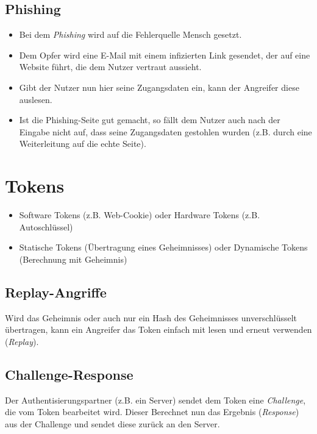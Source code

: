 \documentclass[a4paper, 11pt, accentcolor = tud3b]{tudreport}
\begin{document}
            \subsection{Phishing}
                \begin{itemize}
                	\item Bei dem \textit{Phishing} wird auf die Fehlerquelle Mensch gesetzt.
                	\item Dem Opfer wird eine E-Mail mit einem infizierten Link gesendet, der auf eine Website führt, die dem Nutzer vertraut aussieht.
                	\item Gibt der Nutzer nun hier seine Zugangsdaten ein, kann der Angreifer diese auslesen.
                	\item Ist die Phishing-Seite gut gemacht, so fällt dem Nutzer auch nach der Eingabe nicht auf, dass seine Zugangsdaten gestohlen wurden (z.B. durch eine Weiterleitung auf die echte Seite).
                \end{itemize}

        \section{Tokens}
	        \begin{itemize}
	        	\item Software Tokens (z.B. Web-Cookie) oder Hardware Tokens (z.B. Autoschlüssel)
	        	\item Statische Tokens (Übertragung eines Geheimnisses) oder Dynamische Tokens (Berechnung mit Geheimnis)
	        \end{itemize}

            \subsection{Replay-Angriffe}
                Wird das Geheimnis oder auch nur ein Hash des Geheimnisses unverschlüsselt übertragen, kann ein Angreifer das Token einfach mit lesen und erneut verwenden (\textit{Replay}).

            \subsection{Challenge-Response}
                Der Authentisierungspartner (z.B. ein Server) sendet dem Token eine \textit{Challenge}, die vom Token bearbeitet wird. Dieser Berechnet nun das Ergebnis (\textit{Response}) aus der Challenge und sendet diese zurück an den Server.
                
\end{document}
